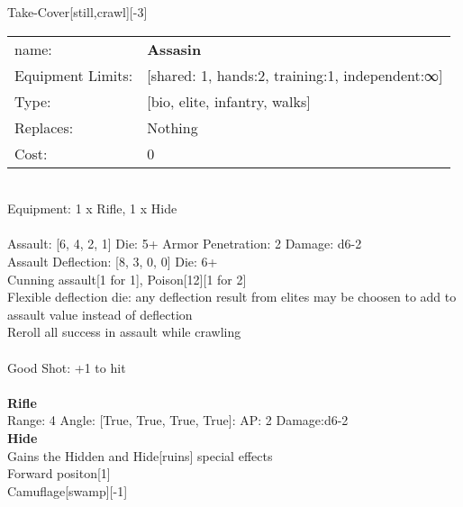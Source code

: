 \noindent Take-Cover[still,crawl][-3]\\ 


\noindent
\begin{tabular}{ll}
name: &{\bf Assasin } \\
Equipment Limits: &[shared: 1, hands:2, training:1, independent:∞] \\
Type: &[bio, elite, infantry, walks] \\
Replaces: &Nothing \\
Cost: & 0\\
\end{tabular}
\ \\
Equipment: 1 x Rifle, 1 x Hide \\
\ \\
Assault: [6, 4, 2, 1] Die: 5+ Armor Penetration: 2 Damage: d6-2 \\
Assault Deflection: [8, 3, 0, 0] Die: 6+\\
\indent Cunning assault[1 for 1], Poison[12][1 for 2]\\ 
Flexible deflection die: any deflection result from elites may be choosen to add to assault value instead of deflection\\ 
Reroll all success in assault while crawling\\ 
 
\ \\
Good Shot: +1 to hit\\ 

\ \\
{\bf Rifle } \\



Range: 4  Angle: [True, True, True, True]: AP: 2 Damage:d6-2 \\




{\bf Hide } \\

Gains the Hidden and Hide[ruins] special effects\\ 
Forward positon[1]\\ 
Camuflage[swamp][-1]\\ 





 
\ \\



